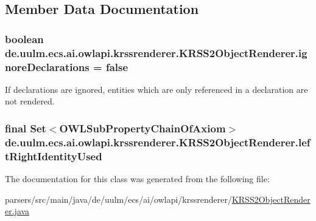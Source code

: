 \subsection{Member Data Documentation}
\hypertarget{classde_1_1uulm_1_1ecs_1_1ai_1_1owlapi_1_1krssrenderer_1_1_k_r_s_s2_object_renderer_a26ebca229892f797561346db5d8360d8}{
\subsubsection[{ignore\-Declarations}]{\setlength{\rightskip}{0pt plus 5cm}boolean de.\-uulm.\-ecs.\-ai.\-owlapi.\-krssrenderer.\-K\-R\-S\-S2\-Object\-Renderer.\-ignore\-Declarations = false\hspace{0.3cm}{\ttfamily [protected]}}}\label{classde_1_1uulm_1_1ecs_1_1ai_1_1owlapi_1_1krssrenderer_1_1_k_r_s_s2_object_renderer_a26ebca229892f797561346db5d8360d8}
If declarations are ignored, entities which are only referenced in a declaration are not rendered. \hypertarget{classde_1_1uulm_1_1ecs_1_1ai_1_1owlapi_1_1krssrenderer_1_1_k_r_s_s2_object_renderer_a0ab5594838340ba44168d6de5ad361b2}{
\subsubsection[{left\-Right\-Identity\-Used}]{\setlength{\rightskip}{0pt plus 5cm}final Set$<${\bf O\-W\-L\-Sub\-Property\-Chain\-Of\-Axiom}$>$ de.\-uulm.\-ecs.\-ai.\-owlapi.\-krssrenderer.\-K\-R\-S\-S2\-Object\-Renderer.\-left\-Right\-Identity\-Used\hspace{0.3cm}{\ttfamily [private]}}}\label{classde_1_1uulm_1_1ecs_1_1ai_1_1owlapi_1_1krssrenderer_1_1_k_r_s_s2_object_renderer_a0ab5594838340ba44168d6de5ad361b2}


The documentation for this class was generated from the following file\-:\begin{DoxyCompactItemize}
\item 
parsers/src/main/java/de/uulm/ecs/ai/owlapi/krssrenderer/\hyperlink{_k_r_s_s2_object_renderer_8java}{K\-R\-S\-S2\-Object\-Renderer.\-java}\end{DoxyCompactItemize}
